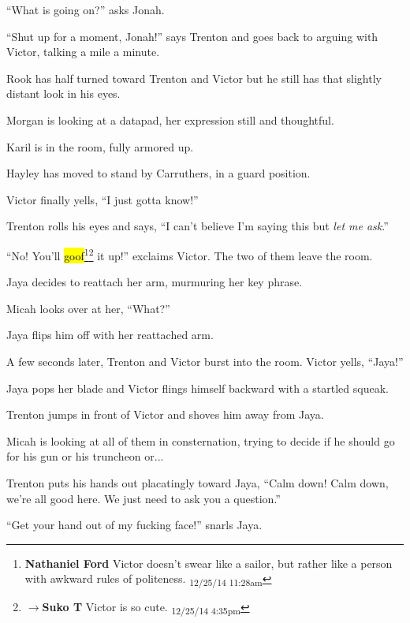 ``What is going on?'' asks Jonah.

``Shut up for a moment, Jonah!'' says Trenton and goes back to arguing with Victor, talking a mile a minute.



Rook has half turned toward Trenton and Victor but he still has that slightly distant look in his eyes.

Morgan is looking at a datapad, her expression still and thoughtful.

Karil is in the room, fully armored up.

Hayley has moved to stand by Carruthers, in a guard position.



Victor finally yells, ``I just gotta know!''

Trenton rolls his eyes and says, ``I can't believe I'm saying this but \textit{let me ask}.''

``No!  You'll \hl{goof}\footnote{\textbf{Nathaniel Ford }Victor doesn't swear like a sailor, but rather like a person with awkward rules of politeness. \textsubscript{12/25/14 11:28am}}\footnote{$\rightarrow$\textbf{Suko T }Victor is so cute. \textsubscript{12/25/14 4:35pm}} it up!'' exclaims Victor.  The two of them leave the room.





Jaya decides to reattach her arm, murmuring her key phrase. 

Micah looks over at her, ``What?''

Jaya flips him off with her reattached arm.



A few seconds later, Trenton and Victor burst into the room.  Victor yells, ``Jaya!''

Jaya pops her blade and Victor flings himself backward with a startled squeak.

Trenton jumps in front of Victor and shoves him away from Jaya.

Micah is looking at all of them in consternation, trying to decide if he should go for his gun or his truncheon or...



Trenton puts his hands out placatingly toward Jaya, ``Calm down!  Calm down, we're all good here.  We just need to ask you a question.''

``Get your hand out of my fucking face!'' snarls Jaya.

